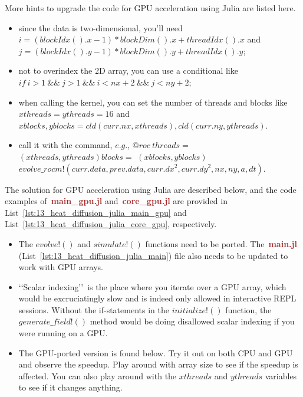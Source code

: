 \par
More hints to upgrade the code for GPU acceleration using Julia are listed here.
\begin{itemize}
    \item since the data is two-dimensional, you’ll need $i = (blockIdx().x - 1) * blockDim().x + threadIdx().x$ and $j = (blockIdx().y - 1) * blockDim().y + threadIdx().y$;
    \item not to overindex the 2D array, you can use a conditional like $if~i>1~\&\&~j > 1~\&\&~i < nx+2~\&\&~j < ny+2$;
    \item when calling the kernel, you can set the number of threads and blocks like $xthreads = ythreads = 16$ and $xblocks, yblocks = cld(curr.nx, xthreads), cld(curr.ny, ythreads)$.
    \item call it with the command, $e.g.$, $@roc~threads=$ $(xthreads, ythreads) blocks=$ $(xblocks, yblocks)$ $evolve\_rocm!(curr.data,prev.data,curr.dx^2,curr.dy^2,nx,ny,a,dt)$.
\end{itemize}


\par
The solution for GPU acceleration using Julia are described below, and the code examples of~\textbf{\textcolor{brown}{main\_gpu.jl}} and~\textbf{\textcolor{brown}{core\_gpu.jl}} are provided in List~\ref{lst:13_heat_diffusion_julia_main_gpu} and List~\ref{lst:13_heat_diffusion_julia_core_gpu}, respectively.
\begin{itemize}
    \item The $evolve!()$ and $simulate!()$ functions need to be ported. The~\textbf{\textcolor{brown}{main.jl}} (List~\ref{lst:13_heat_diffusion_julia_main}) file also needs to be updated to work with GPU arrays.
    \item \lq\lq Scalar indexing\rq\rq~is the place where you iterate over a GPU array, which would be excruciatingly slow and is indeed only allowed in interactive REPL sessions. Without the if-statements in the $initialize!()$ function, the $generate\_field!()$ method would be doing disallowed scalar indexing if you were running on a GPU.
    \item The GPU-ported version is found below. Try it out on both CPU and GPU and observe the speedup. Play around with array size to see if the speedup is affected. You can also play around with the $xthreads$ and $ythreads$ variables to see if it changes anything.
\end{itemize}





